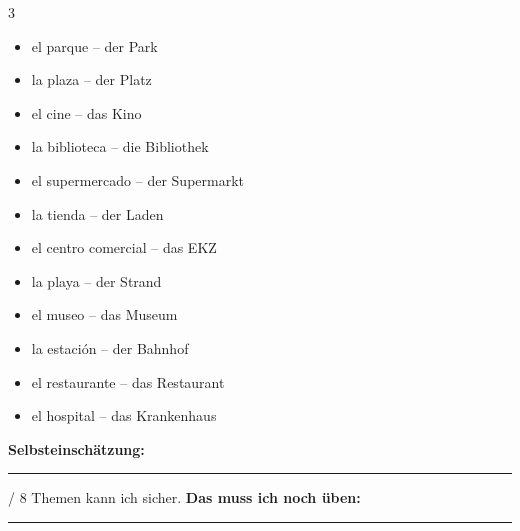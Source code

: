 \documentclass[10pt, a4paper]{article}
\begin{document}
\begin{themabox}
\small
\begin{multicols}{3}
\begin{itemize}[leftmargin=15pt, itemsep=1pt]
    \item el parque -- der Park
    \item la plaza -- der Platz
    \item el cine -- das Kino
    \item la biblioteca -- die Bibliothek
\end{itemize}
\columnbreak
\begin{itemize}[leftmargin=15pt, itemsep=1pt]
    \item el supermercado -- der Supermarkt
    \item la tienda -- der Laden
    \item el centro comercial -- das EKZ
    \item la playa -- der Strand
\end{itemize}
\columnbreak
\begin{itemize}[leftmargin=15pt, itemsep=1pt]
    \item el museo -- das Museum
    \item la estación -- der Bahnhof
    \item el restaurante -- das Restaurant
    \item el hospital -- das Krankenhaus
\end{itemize}
\end{multicols}

\end{themabox}

\vspace{4pt}

\small
\textbf{Selbsteinschätzung:} \rule{0.8cm}{0.4pt} / 8 Themen kann ich sicher. \hfill
\textbf{Das muss ich noch üben:} \rule{5cm}{0.4pt}
\end{document}
